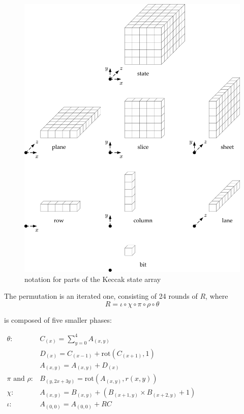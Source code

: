 \documentclass[times, utf8, diplomski]{fer}
\begin{document}
\begin{figure}[htb]
    \centering
    \includegraphics{images/keccak_state.png}
    \caption{notation for parts of the Keccak state array}
    \label{fig:keccak_state}
\end{figure}

The permutation is an iterated one, consisting of 24 rounds of $R$, where
\begin{equation*}
  R = \iota \circ \chi \circ \pi \circ \rho \circ \theta
\end{equation*}

is composed of five smaller phases:

$\begin{array}{rl}
  \theta:& C_{(x)} = \sum\limits_{y=0}^4 A_{(x,y)}\\
  &D_{(x)} = C_{(x-1)} + \text{rot}(C_{(x+1)},1)\\
  &A_{(x,y)} = A_{(x,y)} + D_{(x)}\\
  \pi \text{ and }\rho:& B_{(y,2x+3y)} = \text{rot}(A_{(x,y)}, r(x,y))\\
  \chi:& A_{(x,y)} = B_{(x,y)} + (B_{(x+1,y)} \times B_{(x+2,y)} + 1)\\
  \iota:& A_{(0,0)} = A_{(0,0)} + RC\\
\end{array}$\\
\end{document}
